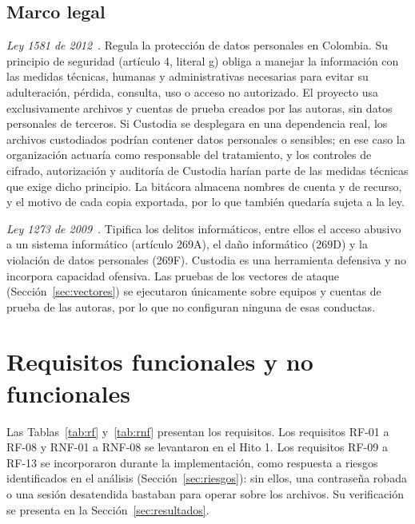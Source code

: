 \documentclass[conference]{IEEEtran}
\begin{document}
\subsection{Marco legal}
\textit{Ley 1581 de 2012}~\cite{ley1581}. Regula la protección de datos personales en Colombia. Su principio de seguridad (artículo 4, literal g) obliga a manejar la información con las medidas técnicas, humanas y administrativas necesarias para evitar su adulteración, pérdida, consulta, uso o acceso no autorizado. El proyecto usa exclusivamente archivos y cuentas de prueba creados por las autoras, sin datos personales de terceros. Si Custodia se desplegara en una dependencia real, los archivos custodiados podrían contener datos personales o sensibles; en ese caso la organización actuaría como responsable del tratamiento, y los controles de cifrado, autorización y auditoría de Custodia harían parte de las medidas técnicas que exige dicho principio. La bitácora almacena nombres de cuenta y de recurso, y el motivo de cada copia exportada, por lo que también quedaría sujeta a la ley.

\textit{Ley 1273 de 2009}~\cite{ley1273}. Tipifica los delitos informáticos, entre ellos el acceso abusivo a un sistema informático (artículo 269A), el daño informático (269D) y la violación de datos personales (269F). Custodia es una herramienta defensiva y no incorpora capacidad ofensiva. Las pruebas de los vectores de ataque (Sección~\ref{sec:vectores}) se ejecutaron únicamente sobre equipos y cuentas de prueba de las autoras, por lo que no configuran ninguna de esas conductas.

\section{Requisitos funcionales y no funcionales}
\label{sec:requisitos}

Las Tablas~\ref{tab:rf} y~\ref{tab:rnf} presentan los requisitos. Los requisitos RF-01 a RF-08 y RNF-01 a RNF-08 se levantaron en el Hito 1. Los requisitos RF-09 a RF-13 se incorporaron durante la implementación, como respuesta a riesgos identificados en el análisis (Sección~\ref{sec:riesgos}): sin ellos, una contraseña robada o una sesión desatendida bastaban para operar sobre los archivos. Su verificación se presenta en la Sección~\ref{sec:resultados}.
\end{document}
